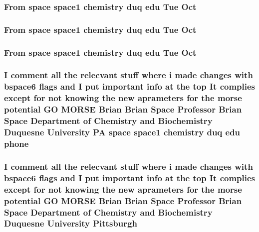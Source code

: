 \subsubsection{\setlength{\rightskip}{0pt plus 5cm}From space space1 chemistry duq edu {\bf Tue} {\bf Oct}}\label{md__fmorse_8c_6087a155496d792cae644480cd8e79d8}


\subsubsection{\setlength{\rightskip}{0pt plus 5cm}From space space1 chemistry duq edu {\bf Tue} {\bf Oct}}\label{md__fmorse_8c_6087a155496d792cae644480cd8e79d8}


\subsubsection{\setlength{\rightskip}{0pt plus 5cm}From space space1 chemistry duq edu {\bf Tue} {\bf Oct}}\label{md__fmorse_8c_6087a155496d792cae644480cd8e79d8}


\subsubsection{\setlength{\rightskip}{0pt plus 5cm}I comment all the relecvant stuff where i made changes {\bf with} bspace6 flags and I put important info at the top It complies except for not knowing the new aprameters for the morse potential GO MORSE Brian Brian Space Professor Brian Space Department of Chemistry and Biochemistry Duquesne University PA space space1 chemistry duq edu {\bf phone}}\label{md__fmorse_8c_8876df97e894a6c803851635bcb56626}


\subsubsection{\setlength{\rightskip}{0pt plus 5cm}I comment all the relecvant stuff where i made changes {\bf with} bspace6 flags and I put important info at the top It complies except for not knowing the new aprameters for the morse potential GO MORSE Brian Brian Space Professor Brian Space Department of Chemistry and Biochemistry Duquesne University {\bf Pittsburgh}}\label{md__fmorse_8c_9e5e813ca04c17b3e0ea27e4734e954a}


\subsubsection{}\label{md__fmorse_8c_ef451b6aba35c987dfbaede2aeec57df}


